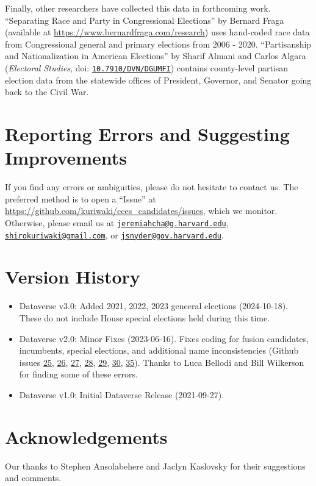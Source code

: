 \documentclass[12pt]{article}
\begin{document}


Finally, other researchers have collected this data in forthcoming work. ``Separating Race and Party in Congressional
Elections'' by Bernard Fraga (available at \url{https://www.bernardfraga.com/research}) uses hand-coded race data from Congressional general and primary elections from 2006 - 2020. ``Partisanship and Nationalization in American Elections'' by Sharif Almani and Carlos Algara (\emph{Electoral Studies}, doi: \href{https://doi.org/10.7910/DVN/DGUMFI}{\texttt{10.7910/DVN/DGUMFI}}) contains county-level partisan election data from the statewide offices of President, Governor, and Senator going back to the Civil War.

\section{Reporting Errors and Suggesting Improvements}

If you find any errors or ambiguities, please do not hesitate to contact us. The preferred method is to open a ``Issue'' at \url{https://github.com/kuriwaki/cces_candidates/issues}, which we monitor. Otherwise, please email us at \href{mailto:jeremiahcha@g.harvard.edu}{\texttt{jeremiahcha@g.harvard.edu}}, \href{mailto:shirokuriwaki@gmail.com}{\texttt{shirokuriwaki@gmail.com}}, or \href{mailto:jsnyder@gov.harvard.edu}{\texttt{jsnyder@gov.harvard.edu}}.



\section{Version History}

\begin{itemize}
\item Dataverse v3.0: Added 2021, 2022, 2023 geneeral elections (2024-10-18). These do not include House special elections held during this time.
\item Dataverse v2.0: Minor Fixes (2023-06-16). Fixes coding for fusion candidates, incumbents, special elections, and additional name inconsistencies (Github issues \href{https://github.com/kuriwaki/cces_candidates/issues/25}{25}, \href{https://github.com/kuriwaki/cces_candidates/issues/26}{26}, \href{https://github.com/kuriwaki/cces_candidates/issues/27}{27}, \href{https://github.com/kuriwaki/cces_candidates/issues/28}{28}, \href{https://github.com/kuriwaki/cces_candidates/issues/29}{29}, \href{https://github.com/kuriwaki/cces_candidates/issues/30}{30},
\href{https://github.com/kuriwaki/cces_candidates/issues/35}{35}). Thanks to Luca Bellodi and Bill Wilkerson for finding some of these errors.
\item Dataverse v1.0: Initial Dataverse Release (2021-09-27).
\end{itemize}

\section{Acknowledgements}

Our thanks to Stephen Ansolabehere and Jaclyn Kaslovsky for their suggestions and comments.
\end{document}
